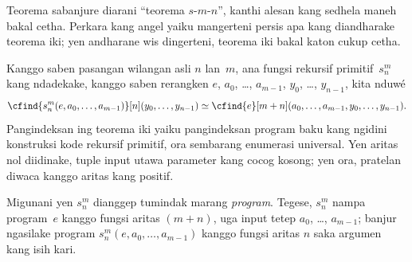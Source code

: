 \documentclass[../../../include/open-logic-section]{subfiles}
\begin{document}

\begin{explain}
Teorema sabanjure diarani ``teorema $s$-$m$-$n$'',
kanthi alesan kang sedhela maneh bakal cetha.
Perkara kang angel yaiku mangerteni persis
apa kang diandharake teorema iki; yen
andharane wis dingerteni, teorema iki
bakal katon cukup cetha.
\end{explain}

\begin{thm}
  Kanggo saben pasangan wilangan asli $n$ lan~$m$,
  ana fungsi rekursif primitif~$s^m_n$ kang
  ndadekake, kanggo saben rerangken
  $e$, $a_0$, \dots, $a_{m-1}$, $y_0$, \dots,
  $y_{n-1}$, kita nduwé
  \[
  \cfind{s^m_n(e, a_0, \dots, a_{m-1})}[n](y_0, \dots, y_{n-1}) \simeq
  \cfind{e}[m+n](a_0, \dots, a_{m-1}, y_0, \dots, y_{n-1}).
\]
Pangindeksan ing teorema iki yaiku pangindeksan program baku kang ngidini konstruksi kode rekursif primitif, ora sembarang enumerasi universal. Yen aritas nol diidinake, tuple input utawa parameter kang cocog kosong; yen ora, pratelan diwaca kanggo aritas kang positif.
\end{thm}

\begin{explain}
Migunani yen $s^m_n$ dianggep tumindak marang
\emph{program}. Tegese, $s^m_n$ nampa program~$e$
kanggo fungsi aritas $(m+n)$, uga input tetep
$a_0$, \dots, $a_{m-1}$; banjur ngasilake program
%
$s^m_n(e, a_0, \dots, a_{m-1})$ kanggo fungsi
aritas $n$ saka argumen kang isih kari.
\end{explain}
\end{document}
